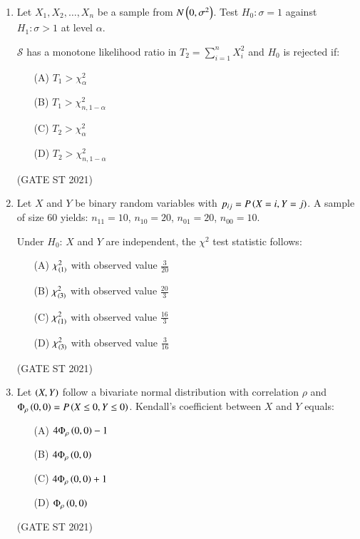 \documentclass[journal,12pt,onecolumn]{IEEEtran}
\theoremstyle{remark}
\begin{document}
\begin{enumerate}
\item
Let $X_1, X_2, \dots, X_n$ be a sample from $N\left(0,\sigma^2\right)$.  
Test $H_0: \sigma = 1$ against $H_1: \sigma > 1$ at level $\alpha$.

$\mathcal{S}$ has a monotone likelihood ratio in $T_2 = \sum_{i=1}^n X_i^2$ and $H_0$ is rejected if:
\begin{enumerate}
\item[(A)] $T_1 > \chi_\alpha^2$
\item[(B)] $T_1 > \chi_{n,1-\alpha}^2$
\item[(C)] $T_2 > \chi_\alpha^2$
\item[(D)] $T_2 > \chi_{n,1-\alpha}^2$
\end{enumerate}
\hfill (GATE ST 2021) \\


\item
Let $X$ and $Y$ be binary random variables with $p_{ij} = P\left(X = i, Y = j\right)$.  
A sample of size $60$ yields: $n_{11} = 10$, $n_{10} = 20$, $n_{01} = 20$, $n_{00} = 10$.

Under $H_0$: $X$ and $Y$ are independent, the $\chi^2$ test statistic follows:

\begin{enumerate}
\item[(A)] $\chi^2_{\left(1\right)}$ with observed value $\frac{3}{20}$
\item[(B)] $\chi^2_{\left(3\right)}$ with observed value $\frac{20}{3}$
\item[(C)] $\chi^2_{\left(1\right)}$ with observed value $\frac{16}{3}$
\item[(D)] $\chi^2_{\left(3\right)}$ with observed value $\frac{3}{16}$
\end{enumerate}
\hfill (GATE ST 2021) \\


\item
Let $\left(X,Y\right)$ follow a bivariate normal distribution with correlation $\rho$ and $\Phi_\rho\left(0,0\right)= P\left(X \leq 0, Y \leq 0\right)$.  
Kendall's coefficient between $X$ and $Y$ equals:
\begin{enumerate}
\item[(A)] $4\Phi_\rho\left(0,0\right) - 1$
\item[(B)] $4\Phi_\rho\left(0,0\right)$
\item[(C)] $4\Phi_\rho\left(0,0\right) + 1$
\item[(D)] $\Phi_\rho\left(0,0\right)$
\end{enumerate}
\hfill (GATE ST 2021) \\


\end{enumerate}
\end{document}
